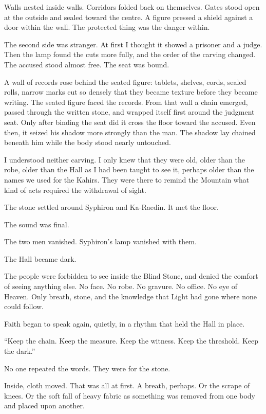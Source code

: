 Walls nested inside walls.
Corridors folded back on themselves.
Gates stood open at the outside and sealed toward the centre.
A figure pressed a shield against a door within the wall.
The protected thing was the danger within.\par
The second side was stranger.
At first I thought it showed a prisoner and a judge.
Then the lamp found the cuts more fully, and the order of the carving changed.
The accused stood almost free.
The seat was bound.\par
A wall of records rose behind the seated figure: tablets, shelves, cords, sealed rolls, narrow marks cut so densely that they became texture before they became writing.
The seated figure faced the records.
From that wall a chain emerged, passed through the written stone, and wrapped itself first around the judgment seat.
Only after binding the seat did it cross the floor toward the accused.
Even then, it seized his shadow more strongly than the man.
The shadow lay chained beneath him while the body stood nearly untouched.\par
I understood neither carving.
I only knew that they were old, older than the robe, older than the Hall as I had been taught to see it, perhaps older than the names we used for the Kahirs.
They were there to remind the Mountain what kind of acts required the withdrawal of sight.\par
The stone settled around Syphiron and Ka-Raedin.
It met the floor.\par
The sound was final.\par
The two men vanished.
Syphiron's lamp vanished with them.\par
The Hall became dark.\par
The people were forbidden to see inside the Blind Stone, and denied the comfort of seeing anything else.
No face.
No robe.
No gravure.
No office.
No eye of Heaven.
Only breath, stone, and the knowledge that Light had gone where none could follow.\par
Faith began to speak again, quietly, in a rhythm that held the Hall in place.\par
``Keep the chain.
Keep the measure.
Keep the witness.
Keep the threshold.
Keep the dark.''\par
No one repeated the words.
They were for the stone.\par
Inside, cloth moved.
That was all at first.
A breath, perhaps.
Or the scrape of knees.
Or the soft fall of heavy fabric as something was removed from one body and placed upon another.
